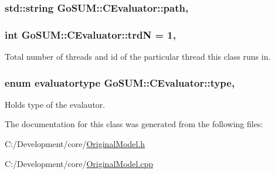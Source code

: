 \hypertarget{class_go_s_u_m_1_1_c_evaluator_aef57af904e0ce1e60ed12034a369a994}{
\subsubsection[{path}]{\setlength{\rightskip}{0pt plus 5cm}std\-::string Go\-S\-U\-M\-::\-C\-Evaluator\-::path\hspace{0.3cm}{\ttfamily [static]}, {\ttfamily [protected]}}}\label{class_go_s_u_m_1_1_c_evaluator_aef57af904e0ce1e60ed12034a369a994}
\hypertarget{class_go_s_u_m_1_1_c_evaluator_ad38d33c6185379f37aab2da03b471f8f}{
\subsubsection[{trd\-N}]{\setlength{\rightskip}{0pt plus 5cm}int Go\-S\-U\-M\-::\-C\-Evaluator\-::trd\-N = 1\hspace{0.3cm}{\ttfamily [static]}, {\ttfamily [protected]}}}\label{class_go_s_u_m_1_1_c_evaluator_ad38d33c6185379f37aab2da03b471f8f}


Total number of threads and id of the particular thread this class runs in. 

\hypertarget{class_go_s_u_m_1_1_c_evaluator_ad6fd7df40c7a7b4ccc9adec41d7442f8}{
\subsubsection[{type}]{\setlength{\rightskip}{0pt plus 5cm}enum {\bf evaluatortype} Go\-S\-U\-M\-::\-C\-Evaluator\-::type\hspace{0.3cm}{\ttfamily [static]}, {\ttfamily [protected]}}}\label{class_go_s_u_m_1_1_c_evaluator_ad6fd7df40c7a7b4ccc9adec41d7442f8}


Holds type of the evalautor. 



The documentation for this class was generated from the following files\-:\begin{DoxyCompactItemize}
\item 
C\-:/\-Development/core/\hyperlink{_original_model_8h}{Original\-Model.\-h}\item 
C\-:/\-Development/core/\hyperlink{_original_model_8cpp}{Original\-Model.\-cpp}\end{DoxyCompactItemize}

